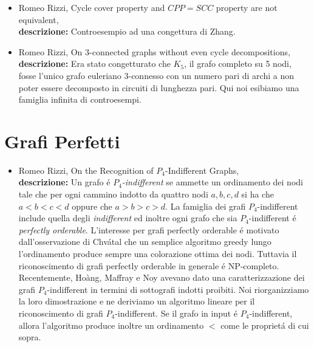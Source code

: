 \documentclass[10pt]{article}
\begin{document}
\begin{itemize}
  \vspace{1.4mm}
  \item[] {\sc Romeo Rizzi},
   \newblock  Cycle cover property and $CPP=SCC$ property are not equivalent,
   \\
{\bf descrizione:}
Controesempio ad una congettura di Zhang.\\

  \vspace{1.4mm}
  \item[] {\sc Romeo Rizzi},
   \newblock  On $3$-connected graphs without even cycle decompositions,
   \\
{\bf descrizione:}
Era stato congetturato che $K_5$,
il grafo completo su 5 nodi,
fosse l'unico grafo euleriano $3$-connesso
con un numero pari di archi a non poter essere
decomposto in circuiti di lunghezza pari.
Qui noi esibiamo una famiglia infinita
di controesempi.\\
\end{itemize}



\section{Grafi Perfetti}

\begin{itemize}
  \vspace{1.4mm}
  \item[] {\sc Romeo Rizzi},
   \newblock  On the Recognition of $P_4$-Indifferent Graphs,
    \\
{\bf descrizione:}
Un grafo \'e
$P_4${\em -indifferent}
se ammette un ordinamento dei nodi
tale che per ogni cammino indotto
da quattro nodi $a,b,c,d$
si ha che $a<b<c<d$
oppure che $a>b>c>d$.
La famiglia dei grafi $P_4$-indifferent
include quella degli {\em indifferent}
ed inoltre ogni grafo che sia $P_4$-indifferent
\'e {\em perfectly orderable}.
L'interesse per grafi perfectly orderable
\'e motivato dall'osservazione di Chv\'atal
che un semplice algoritmo greedy
lungo l'ordinamento
produce sempre una colorazione ottima dei nodi.
Tuttavia il riconoscimento di grafi perfectly orderable
in generale \'e NP-completo.
Recentemente, Ho\`ang, Maffray e Noy
avevano dato una caratterizzazione dei grafi $P_4$-indifferent
in termini di sottografi indotti proibiti.
Noi riorganizziamo la loro dimostrazione
e ne deriviamo un algoritmo lineare per il riconoscimento
di grafi $P_4$-indifferent.
Se il grafo in input \'e $P_4$-indifferent,
allora l'algoritmo produce inoltre un ordinamento $<$
come le propriet\'a di cui sopra.\\
\end{itemize}
\end{document}
